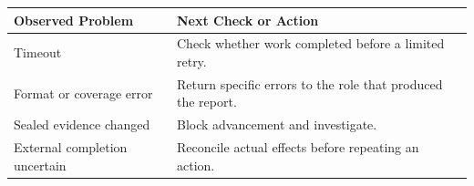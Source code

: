 \begin{tabular}{@{}P{4.0cm}P{8.5cm}@{}}
\toprule
\textbf{Observed Problem} & \textbf{Next Check or Action} \\
\midrule
Timeout & Check whether work completed before a limited retry. \\
Format or coverage error & Return specific errors to the role that produced the report. \\
Sealed evidence changed & Block advancement and investigate. \\
External completion uncertain & Reconcile actual effects before repeating an action. \\
\bottomrule
\end{tabular}
